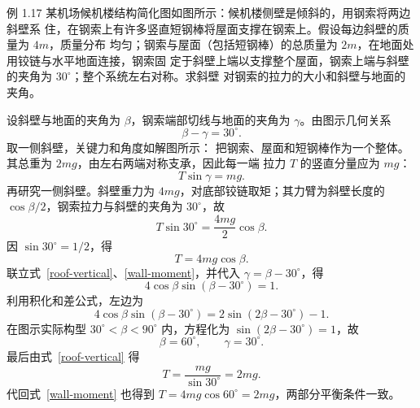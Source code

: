 \begin{origexamplebox}{例 1.17}
某机场候机楼结构简化图如图所示：候机楼侧壁是倾斜的，用钢索将两边斜壁系
住，在钢索上有许多竖直短钢棒将屋面支撑在钢索上。假设每边斜壁的质量为 $4m$，质量分布
均匀；钢索与屋面（包括短钢棒）的总质量为 $2m$，在地面处用铰链与水平地面连接，钢索固
定于斜壁上端以支撑整个屋面，钢索上端与斜壁的夹角为 $30^\circ$；整个系统左右对称。求斜壁
对钢索的拉力的大小和斜壁与地面的夹角。
\end{origexamplebox}

\begin{xesolution}
设斜壁与地面的夹角为 $\beta$，钢索端部切线与地面的夹角为 $\gamma$。由图示几何关系
\[
  \beta-\gamma=30^\circ.
\]
取一侧斜壁，关键力和角度如解图所示：
\soldiagOneSeventeen
把钢索、屋面和短钢棒作为一个整体。其总重为 $2mg$，由左右两端对称支承，因此每一端
拉力 $T$ 的竖直分量应为 $mg$：
\begin{equation}\label{roof-vertical}
  T\sin\gamma=mg.
\end{equation}
再研究一侧斜壁。斜壁重力为 $4mg$，对底部铰链取矩；其力臂为斜壁长度的
$\cos\beta/2$，钢索拉力与斜壁的夹角为 $30^\circ$，故
\[
  T\sin30^\circ=\frac{4mg}{2}\cos\beta.
\]
因 $\sin30^\circ=1/2$，得
\begin{equation}\label{wall-moment}
 T=4mg\cos\beta.
\end{equation}
联立式~\eqref{roof-vertical}、\eqref{wall-moment}，并代入 $\gamma=\beta-30^\circ$，得
\[
  4\cos\beta\sin(\beta-30^\circ)=1.
\]
利用积化和差公式，左边为
\[
  4\cos\beta\sin(\beta-30^\circ)
  =2\sin(2\beta-30^\circ)-1.
\]
在图示实际构型 $30^\circ<\beta<90^\circ$ 内，方程化为
$\sin(2\beta-30^\circ)=1$，故
\[
  \boxed{\beta=60^\circ},\qquad \gamma=30^\circ.
\]
最后由式~\eqref{roof-vertical} 得
\[
  \boxed{T=\frac{mg}{\sin30^\circ}=2mg}.
\]
代回式~\eqref{wall-moment} 也得到 $T=4mg\cos60^\circ=2mg$，两部分平衡条件一致。
\end{xesolution}
